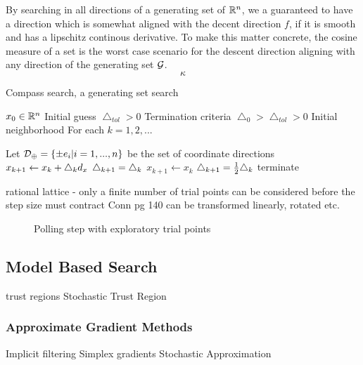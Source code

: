 By searching in all directions of a generating set of $\mathbb{R}^{n}$, we a guaranteed to have a direction which is somewhat aligned with the decent direction $f$, if it is smooth and has a lipschitz continous derivative.  To make this matter concrete, the cosine measure of a set is the worst case scenario for the descent direction aligning with any direction of the generating set $\mathcal{G}$.
\begin{equation}
\kappa
\end{equation}


\begin{algorithm}
\caption{Compass search, a generating set search}\label{dfo_genset}
\begin{algorithmic}
\State $x_0 \in \mathbb{R}^{n}$ Initial guess
\State $\bigtriangleup_{tol} >0$ Termination criteria
\State $\bigtriangleup_0 > \bigtriangleup_{tol} >0$ Initial neighborhood
\BState For each $k=1,2,...$

\State Let $\mathcal{D}_\oplus =\left\{ \pm e_i| i=1,...,n\right\}$ be the set of coordinate directions
\State $x_{k+1} \gets x_k + \bigtriangleup_k d_x$
\State $\bigtriangleup_{k+1} = \bigtriangleup_k$
\Else
\State $x_{k+1} \gets x_k$
\State $\bigtriangleup_{k+1} = \frac{1}{2} \bigtriangleup_k$
 terminate \EndIf
\EndIf
\EndProcedure
\end{algorithmic}
\end{algorithm}


rational lattice - only a finite number of trial points can be considered before the step size must contract
Conn pg 140
can be transformed linearly, rotated etc.


\begin{figure}
\centering

\caption{Polling step with exploratory trial points}
\end{figure}





\subsection{Model Based Search}
trust regions
Stochastic Trust Region \endnote{}

\subsubsection*{Approximate Gradient Methods}
Implicit filtering
Simplex gradients
Stochastic Approximation

